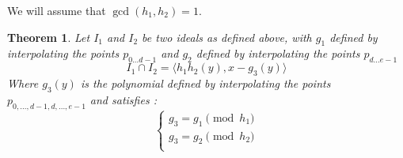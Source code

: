 \documentclass{article}
\newtheorem{theorem}{Theorem}[section]
\begin{document}
We will assume that $\gcd(h_{1}, h_{2}) = 1$.

\begin{theorem} 
    Let $I_{1}$ and $I_{2}$ be two ideals as defined above, with $g_{1}$ defined by interpolating the points $p_{0...d-1}$ and $g_{2}$ defined by interpolating the points $p_{d...e-1}$
    \begin{displaymath}
        I_{1} \cap I_{2} = \langle h_{1}h_{2}(y), x - g_{3}(y) \rangle
    \end{displaymath}
    Where $g_{3}(y)$ is the polynomial defined by interpolating the points $p_{0,...,d-1,d,...,e-1}$ and satisfies :
    \begin{displaymath}
    \left\{
    \begin{array}{ll}
        g_{3} = g_{1} \pmod {h_{1}} \\
        g_{3} = g_{2} \pmod {h_{2}} \\
    \end{array}
    \right.
    \end{displaymath} 
\end{theorem}
\end{document}
